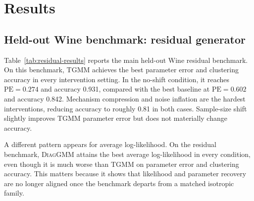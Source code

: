\documentclass{article}
\newcommand{\tgmm}{\textsc{TGMM}}
\newcommand{\diaggmm}{\textsc{DiagGMM}}
\newcommand{\PE}{\mathrm{PE}}
\begin{document}
\section{Results}
\subsection{Held-out Wine benchmark: residual generator}
Table~\ref{tab:residual-results} reports the main held-out Wine residual benchmark. On this benchmark, \tgmm{} achieves the best parameter error and clustering accuracy in every intervention setting. In the no-shift condition, it reaches $\PE=0.274$ and accuracy 0.931, compared with the best baseline at $\PE=0.602$ and accuracy 0.842. Mechanism compression and noise inflation are the hardest interventions, reducing accuracy to roughly 0.81 in both cases. Sample-size shift slightly improves \tgmm{} parameter error but does not materially change accuracy.

A different pattern appears for average log-likelihood. On the residual benchmark, \diaggmm{} attains the best average log-likelihood in every condition, even though it is much worse than \tgmm{} on parameter error and clustering accuracy. This matters because it shows that likelihood and parameter recovery are no longer aligned once the benchmark departs from a matched isotropic family.
\end{document}
